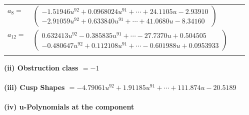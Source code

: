 \documentclass[1p]{elsarticle_modified}
\theoremstyle{definition}
\begin{document}
\begin{tabular}{m{7pt} m{180pt} m{7pt} m{180pt} }
\flushright $a_{8}=$&$\begin{pmatrix}-1.51946 u^{92}+0.0968024 u^{91}+\cdots+24.1105 u-2.93910\\-2.91059 u^{92}+0.633840 u^{91}+\cdots+41.0680 u-8.34160\end{pmatrix}$ \\
\flushright $a_{12}=$&$\begin{pmatrix}0.632413 u^{92}-0.385835 u^{91}+\cdots-27.7370 u+0.504505\\-0.480647 u^{92}+0.112108 u^{91}+\cdots-0.601988 u+0.0953933\end{pmatrix}$\\&\end{tabular}
\flushleft \textbf{(ii) Obstruction class $= -1$}\\~\\
\flushleft \textbf{(iii) Cusp Shapes $= -4.79061 u^{92}+1.91185 u^{91}+\cdots+111.874 u-20.5189$}\\~\\
\newpage\renewcommand{\arraystretch}{1}
\flushleft \textbf{(iv) u-Polynomials at the component}\newline \\
\end{document}
